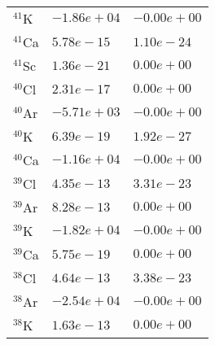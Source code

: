 \begin{tabular}{lll}
 $^{41}$K  & $-1.86e+04 $                                                       & $-0.00e+00 $                                                          \\
 $^{41}$Ca & $5.78e-15 $                                                        & $1.10e-24 $                                                           \\
 $^{41}$Sc & $1.36e-21 $                                                        & $0.00e+00 $                                                           \\
 $^{40}$Cl & $2.31e-17 $                                                        & $0.00e+00 $                                                           \\
 $^{40}$Ar & $-5.71e+03 $                                                       & $-0.00e+00 $                                                          \\
 $^{40}$K  & $6.39e-19 $                                                        & $1.92e-27 $                                                           \\
 $^{40}$Ca & $-1.16e+04 $                                                       & $-0.00e+00 $                                                          \\
 $^{39}$Cl & $4.35e-13 $                                                        & $3.31e-23 $                                                           \\
 $^{39}$Ar & $8.28e-13 $                                                        & $0.00e+00 $                                                           \\
 $^{39}$K  & $-1.82e+04 $                                                       & $-0.00e+00 $                                                          \\
 $^{39}$Ca & $5.75e-19 $                                                        & $0.00e+00 $                                                           \\
 $^{38}$Cl & $4.64e-13 $                                                        & $3.38e-23 $                                                           \\
 $^{38}$Ar & $-2.54e+04 $                                                       & $-0.00e+00 $                                                          \\
 $^{38}$K  & $1.63e-13 $                                                        & $0.00e+00 $                                                           \\

\end{tabular}
